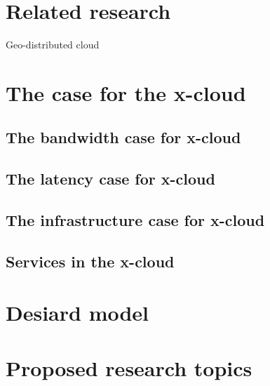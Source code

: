 \documentclass[conference]{IEEEtran}
\newcommand{\xcloud}{x-cloud }
\begin{document}

\section{Related research}

\begin{description}
\item[Geo-distributed cloud] \cite{agarwal2010volley}
\end{description}



\section{The case for the \xcloud}


\subsection{The bandwidth case for \xcloud}


\subsection{The latency case for \xcloud}


\subsection{The infrastructure case for \xcloud}


\subsection{Services in the \xcloud}



\section{Desiard model}



\section{Proposed research topics}

%




%

\end{document}
